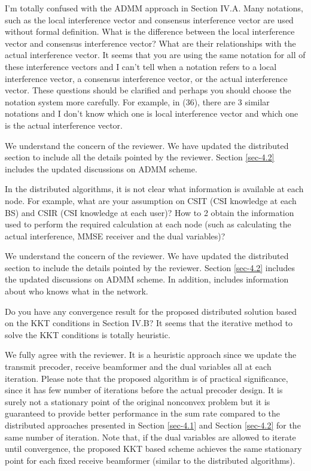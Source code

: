  I’m totally confused with the ADMM approach in Section IV.A. Many notations, such as the local interference vector and consensus interference vector are used without formal definition. What is the difference between the local interference vector and consensus interference vector? What are their relationships with the actual interference vector. It seems that you are using the same notation for all of these interference vectors and I can’t tell when a notation refers to a local interference vector, a consensus interference vector, or the actual interference vector. These questions should be clarified and perhaps you should choose the notation system more carefully. For example, in (36), there are 3 similar notations and I don’t know which one is local interference vector and which one is the actual interference vector.

\resp We understand the concern of the reviewer. We have updated the distributed section to include all the details pointed by the reviewer. Section \ref{sec-4.2} includes the updated discussions on ADMM scheme.

 In the distributed algorithms, it is not clear what information is available at each node. For example, what are your assumption on CSIT (CSI knowledge at each BS) and CSIR (CSI knowledge at each user)? How to 2 obtain the information used to perform the required calculation at each node (such as calculating the actual interference, MMSE receiver and the dual variables)?

\resp We understand the concern of the reviewer. We have updated the distributed section to include the details pointed by the reviewer. Section \ref{sec-4.2} includes the updated discussions on ADMM scheme. In addition,  includes information about who knows what in the network.

 Do you have any convergence result for the proposed distributed solution based on the KKT conditions in Section IV.B? It seems that the iterative method to solve the KKT conditions is totally heuristic.

\resp We fully agree with the reviewer. It is a heuristic approach since we update the transmit precoder, receive beamformer and the dual variables all at each iteration. Please note that the proposed algorithm is of practical significance, since it has few number of iterations before the actual precoder design. It is surely not a stationary point of the original nonconvex problem but it is guaranteed to provide better performance in the sum rate compared to the distributed approaches presented in Section \ref{sec-4.1} and Section \ref{sec-4.2} for the same number of iteration. Note that, if the dual variables are allowed to iterate until convergence, the proposed KKT based scheme achieves the same stationary point for each fixed receive beamformer (similar to the distributed algorithms).

